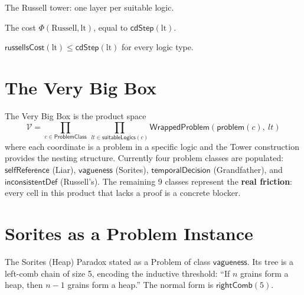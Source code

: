 \begin{definition}
\label{def:russells_tower}
\leanok
{}
The Russell tower: one layer per suitable logic.
\end{definition}

\begin{definition}
\label{def:russells_cost}
\leanok
{}
The cost $\Phi(\text{Russell}, \text{lt})$, equal to $\textsf{cdStep}(\text{lt})$.
\end{definition}

\begin{theorem}
\label{thm:russells_cost_bound}
\leanok
{}
$\textsf{russellsCost}(\text{lt}) \le \textsf{cdStep}(\text{lt})$ for every logic type.
\end{theorem}

\section{The Very Big Box}

The Very Big Box is the product space
\[
\mathcal{V} = \prod_{c \in \mathsf{ProblemClass}}\ \prod_{lt \in \mathsf{suitableLogics}(c)}
\mathsf{WrappedProblem}(\mathsf{problem}(c),\ lt)
\]
where each coordinate is a problem in a specific logic and the
Tower construction provides the nesting structure. Currently four
problem classes are populated: $\mathsf{selfReference}$ (Liar),
$\mathsf{vagueness}$ (Sorites), $\mathsf{temporalDecision}$ (Grandfather),
and $\mathsf{inconsistentDef}$ (Russell's).
The remaining 9 classes represent the \textbf{real friction}: every cell
in this product that lacks a proof is a concrete blocker.

\section{Sorites as a Problem Instance}

\begin{definition}
\label{def:sorites_problem}
\leanok
{}
The Sorites (Heap) Paradox stated as a \textsf{Problem} of class $\mathsf{vagueness}$.
Its tree is a left-comb chain of size 5, encoding the inductive threshold:
``If $n$ grains form a heap, then $n-1$ grains form a heap.''
The normal form is $\mathsf{rightComb}(5)$.
\end{definition}


